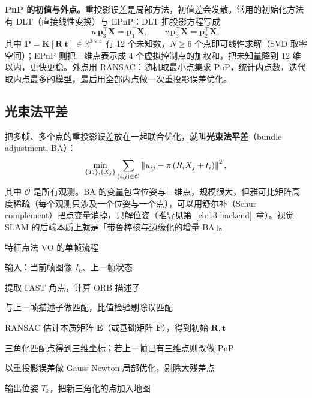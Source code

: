 \textbf{PnP 的初值与外点。}重投影误差是局部方法，初值差会发散。常用的初始化方法有 DLT（直接线性变换）与 EPnP：DLT 把投影方程写成
\begin{equation}
  u\,\bm{p}_3^{\top}\bm{X}= \bm{p}_1^{\top}\bm{X},
  \qquad
  v\,\bm{p}_3^{\top}\bm{X}= \bm{p}_2^{\top}\bm{X},
\end{equation}
其中 $\bm{P}=\bm{K}[\bm{R}\ \bm{t}]\in\mathbb{R}^{3\times4}$ 有 12 个未知数，$N\ge6$ 个点即可线性求解（SVD 取零空间）；EPnP 则把三维点表示成 4 个虚拟控制点的加权和，把未知量降到 12 维以内，更快更稳。外点用 RANSAC：随机取最小点集求 PnP，统计内点数，迭代取内点最多的模型，最后用全部内点做一次重投影误差优化。

\subsection{光束法平差}

把多帧、多个点的重投影误差放在一起联合优化，就叫\textbf{光束法平差}（bundle adjustment, BA）：
\begin{equation}
  \min_{\{T_i\},\{X_j\}}\sum_{(i,j)\in\mathcal{O}}\left\lVert u_{ij}-\pi\left(R_iX_j+t_i\right) \right\rVert^{2},
  \label{eq:08-BA}
\end{equation}
其中 $\mathcal{O}$ 是所有观测。BA 的变量包含位姿与三维点，规模很大，但雅可比矩阵高度稀疏（每个观测只涉及一个位姿与一个点），可以用舒尔补（Schur complement）把点变量消掉，只解位姿（推导见第~\ref{ch:13-backend}~章）。视觉 SLAM 的后端本质上就是「带鲁棒核与边缘化的增量 BA」。

\begin{pseudo}{特征点法 VO 的单帧流程}
  \item 输入：当前帧图像 $I_k$、上一帧状态
  \item 提取 FAST 角点，计算 ORB 描述子
  \item 与上一帧描述子做匹配，比值检验剔除误匹配
  \item RANSAC 估计本质矩阵 $\bm{E}$（或基础矩阵 $\bm{F}$），得到初始 $\bm{R},\bm{t}$
  \item 三角化匹配点得到三维坐标；若上一帧已有三维点则改做 PnP
  \item 以重投影误差做 Gauss-Newton 局部优化，剔除大残差点
  \item 输出位姿 $T_{k}$，把新三角化的点加入地图
\end{pseudo}

